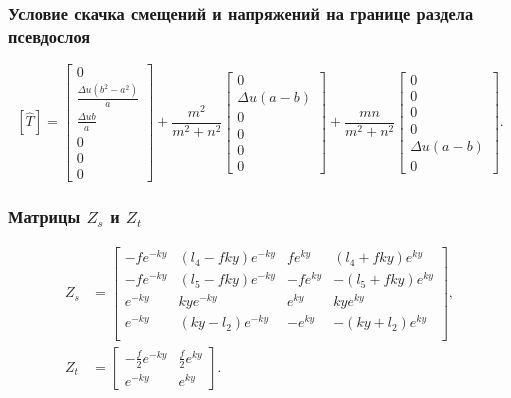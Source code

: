 \begin{frame}
    \frametitle{Условие скачка смещений и напряжений на границе раздела псевдослоя}
    \begin{equation*}
        \left[ \hat{T} \right] = 
        \left[ \begin{array}{c} 
            0 \\ \frac{\Delta u(b^2 - a^2)}{a} \\ \frac{\Delta ub}{a} \\ 0 \\ 0 \\ 0 
        \end{array} \right]
        +
        \frac{m^2}{m^2+n^2} \left[ \begin{array}{c} 
            0 \\ \Delta u(a-b) \\ 0 \\ 0 \\ 0 \\ 0 
        \end{array} \right]
        +
        \frac{mn}{m^2+n^2} \left[ \begin{array}{c} 
            0 \\ 0 \\ 0 \\ 0 \\ \Delta u(a-b) \\ 0 
        \end{array} \right].
    \end{equation*}
\end{frame}

\begin{frame}
    \frametitle{Матрицы $Z_s$ и $Z_t$}
    \begin{equation}
        \label{eq:FourierSeparateA}
        \begin{split}
        Z_s & = 
        \left[
        \begin{array}{cccc}
            -fe^{-ky} & (l_4-fky)e^{-ky} & fe^{ky} & (l_4+fky)e^{ky} \\
            -fe^{-ky} & (l_5-fky)e^{-ky} & -fe^{ky} & -(l_5+fky)e^{ky} \\
            e^{-ky} & kye^{-ky} & e^{ky} & kye^{ky} \\
            e^{-ky} & (ky-l_2)e^{-ky} & -e^{ky} & -(ky+l_2)e^{ky} \\
        \end{array}
        \right],
        \\
        Z_t & = 
        \left[
        \begin{array}{cc}
            -\frac{f}{2}e^{-ky} & \frac{f}{2}e^{ky} \\
            e^{-ky} & e^{ky}
        \end{array}
        \right].
        \end{split}
    \end{equation}
\end{frame}

